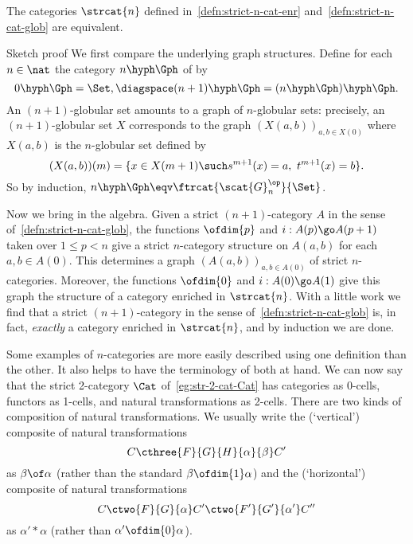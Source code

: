 \begin{propn}	
The categories $\strcat{n}$ defined in~\ref{defn:strict-n-cat-enr}
and~\ref{defn:strict-n-cat-glob} are equivalent.
\end{propn}
%
\begin{prooflike}{Sketch proof}
We first compare the underlying graph structures.  Define for each
$n\in\nat$ the category $n\hyph\Gph$%
% 
%
of %
%
%
by
\[
0\hyph\Gph = \Set,
\diagspace
(n+1)\hyph\Gph = (n\hyph\Gph)\hyph\Gph.
\]
An $(n+1)$-globular set amounts to a graph of $n$-globular sets: precisely,
an $(n+1)$-globular set $X$ corresponds to the graph $(X(a,b))_{a, b \in
X(0)}$ where $X(a,b)$ is the $n$-globular set defined by
\[
(X(a,b))(m) 
=
\{
x \in X(m+1)
\such
s^{m+1}(x) = a,\ 
t^{m+1}(x) = b
\}.
\]
So by induction, $n\hyph\Gph \eqv \ftrcat{\scat{G}_n^\op}{\Set}$.

Now we bring in the algebra.  Given a strict $(n+1)$-category $A$ in the
sense of~\ref{defn:strict-n-cat-glob}, the functions $\ofdim{p}$ and $i:
A(p) \go A(p+1)$ taken over $1\leq p < n$ give a strict $n$-category
structure on $A(a,b)$ for each $a, b \in A(0)$.  This determines a graph
$(A(a,b))_{a, b \in A(0)}$ of strict $n$-categories.  Moreover, the
functions $\ofdim{0}$ and $i: A(0) \go A(1)$ give this graph the structure
of a category enriched in $\strcat{n}$.  With a little work we find that a
strict $(n+1)$-category in the sense of~\ref{defn:strict-n-cat-glob} is, in
fact, \emph{exactly} a category enriched in $\strcat{n}$, and by induction
we are done.  \done
\end{prooflike}

Some examples of $n$-categories are more easily described using one
definition than the other.  It also helps to have the terminology of both
at hand.  We can now say that the strict 2-category $\Cat$
of~\ref{eg:str-2-cat-Cat} has categories as 0-cells, functors as 1-cells,
and natural transformations as 2-cells.  There are two kinds of composition
of natural transformations.  We usually write the (`vertical')%
%
%
composite
of natural transformations
\[
C \cthree{F}{G}{H}{\alpha}{\beta} C'
\]
as $\beta\of\alpha$%
% 
%
(rather than the standard $\beta\ofdim{1}\alpha$) and
the (`horizontal')%
%
%
composite of natural transformations
\[
C \ctwo{F}{G}{\alpha} C' \ctwo{F'}{G'}{\alpha'} C''
\]
as $\alpha' * \alpha$%
% 
%
(rather than $\alpha' \ofdim{0} \alpha$).

